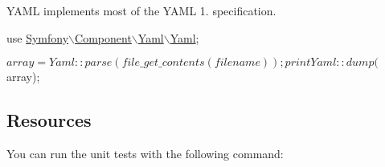 Y\+A\+ML implements most of the Y\+A\+ML 1. specification.


\begin{DoxyCode}
use \hyperlink{namespaceSymfony_1_1Component_1_1Yaml_1_1Yaml}{Symfony\(\backslash\)Component\(\backslash\)Yaml\(\backslash\)Yaml};

$array = Yaml::parse(file\_get\_contents(filename));

print Yaml::dump($array);
\end{DoxyCode}


\subsection*{Resources }

You can run the unit tests with the following command\+: 
 